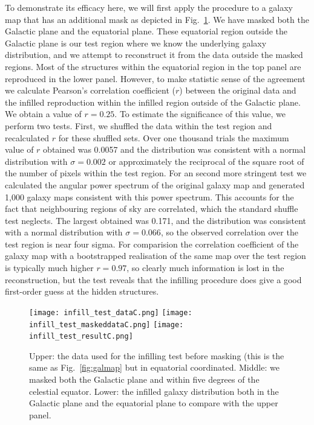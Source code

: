 \documentclass[useAMS,usenatbib]{mn2e}
\begin{document}
To demonstrate its efficacy here, we will first apply the procedure to
a galaxy map that has an additional mask as depicted in
Fig.~\ref{fig:infilling_test}.  We have masked both the Galactic plane
and the equatorial plane.  These equatorial region outside the
Galactic plane is our test region where we know the underlying galaxy
distribution, and we attempt to reconstruct it from the data outside
the masked regions.  Most of the structures within the equatorial
region in the top panel are reproduced in the lower panel.  However,
to make statistic sense of the agreement we calculate Pearson's
correlation coefficient ($r$) between the original data and the
infilled reproduction within the infilled region outside of the
Galactic plane.  We obtain a value of $r=0.25$.  To estimate the
significance of this value, we perform two tests.  First, we shuffled
the data within the test region and recalculated $r$ for these
shuffled sets.  Over one thousand trials the maximum value of $r$
obtained was 0.0057 and the distribution was consistent with a normal
distribution with $\sigma=0.002$ or approximately the reciprocal of
the square root of the number of pixels within the test region.  For
an second more stringent test we calculated the angular power spectrum
of the original galaxy map and generated 1,000 galaxy maps consistent
with this power spectrum.  This accounts for the fact that
neighbouring regions of sky are correlated, which the standard shuffle
test neglects.  The largest obtained was 0.171, and the distribution
was consistent with a normal distribution with $\sigma=0.066$, so the
observed correlation over the test region is near four sigma.  For
comparision the correlation coefficient of the galaxy map with a
bootstrapped realisation of the same map over the test region is
typically much higher $r=0.97$, so clearly much information is lost in
the reconstruction, but the test reveals that the infilling procedure
does give a good first-order guess at the hidden structures.
\begin{figure}
  \texttt{[image: infill\_test\_dataC.png]}
  \texttt{[image: infill\_test\_maskeddataC.png]}
  \texttt{[image: infill\_test\_resultC.png]}
  \caption{Upper: the data used for the infilling test before masking
    (this is the same as Fig.~\ref{fig:galmap} but in equatorial
    coordinated.  Middle: we masked both the Galactic plane and within
    five degrees of the celestial equator.  Lower: the infilled galaxy
    distribution both in the Galactic plane and the equatorial plane
    to compare with the upper panel.}
  \label{fig:infilling_test}
\end{figure}
\end{document}
